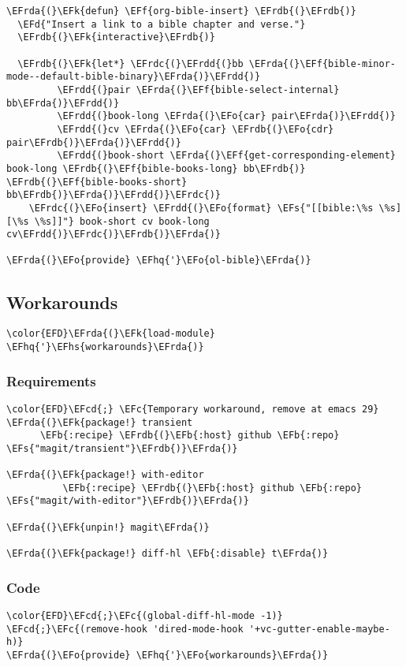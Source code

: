 \documentclass[a4wide,10pt]{article}
\newcommand{\EFc}[1]{\textcolor{EFc}{#1}} %
\newcommand{\EFcd}[1]{\textcolor{EFcd}{#1}} %
\newcommand{\EFs}[1]{\textcolor{EFs}{#1}} %
\newcommand{\EFd}[1]{\textcolor{EFd}{#1}} %
\newcommand{\EFk}[1]{\textcolor{EFk}{#1}} %
\newcommand{\EFb}[1]{\textcolor{EFb}{#1}} %
\newcommand{\EFf}[1]{\textcolor{EFf}{#1}} %
\newcommand{\EFo}[1]{\textcolor{EFo}{#1}} %
\newcommand{\EFhq}[1]{\textcolor{EFhq}{#1}} %
\newcommand{\EFhs}[1]{\textcolor{EFhs}{#1}} %
\newcommand{\EFrda}[1]{\textcolor{EFrda}{#1}} %
\newcommand{\EFrdb}[1]{\textcolor{EFrdb}{#1}} %
\newcommand{\EFrdc}[1]{\textcolor{EFrdc}{#1}} %
\newcommand{\EFrdd}[1]{\textcolor{EFrdd}{#1}} %
\begin{document}
\begin{Code}
\begin{Verbatim}
\EFrda{(}\EFk{defun} \EFf{org-bible-insert} \EFrdb{(}\EFrdb{)}
  \EFd{"Insert a link to a bible chapter and verse."}
  \EFrdb{(}\EFk{interactive}\EFrdb{)}

  \EFrdb{(}\EFk{let*} \EFrdc{(}\EFrdd{(}bb \EFrda{(}\EFf{bible-minor-mode--default-bible-binary}\EFrda{)}\EFrdd{)}
         \EFrdd{(}pair \EFrda{(}\EFf{bible-select-internal} bb\EFrda{)}\EFrdd{)}
         \EFrdd{(}book-long \EFrda{(}\EFo{car} pair\EFrda{)}\EFrdd{)}
         \EFrdd{(}cv \EFrda{(}\EFo{car} \EFrdb{(}\EFo{cdr} pair\EFrdb{)}\EFrda{)}\EFrdd{)}
         \EFrdd{(}book-short \EFrda{(}\EFf{get-corresponding-element} book-long \EFrdb{(}\EFf{bible-books-long} bb\EFrdb{)} \EFrdb{(}\EFf{bible-books-short} bb\EFrdb{)}\EFrda{)}\EFrdd{)}\EFrdc{)}
    \EFrdc{(}\EFo{insert} \EFrdd{(}\EFo{format} \EFs{"[[bible:\%s \%s][\%s \%s]]"} book-short cv book-long cv\EFrdd{)}\EFrdc{)}\EFrdb{)}\EFrda{)}

\EFrda{(}\EFo{provide} \EFhq{'}\EFo{ol-bible}\EFrda{)}
\end{Verbatim}
\end{Code}
\subsection{Workarounds}
\label{sec:org420b92f}
\begin{Code}
\begin{Verbatim}
\color{EFD}\EFrda{(}\EFk{load-module} \EFhq{'}\EFhs{workarounds}\EFrda{)}
\end{Verbatim}
\end{Code}
\subsubsection{Requirements}
\label{sec:orgfca44cc}
\begin{Code}
\begin{Verbatim}
\color{EFD}\EFcd{;} \EFc{Temporary workaround, remove at emacs 29}
\EFrda{(}\EFk{package!} transient
      \EFb{:recipe} \EFrdb{(}\EFb{:host} github \EFb{:repo} \EFs{"magit/transient"}\EFrdb{)}\EFrda{)}

\EFrda{(}\EFk{package!} with-editor
          \EFb{:recipe} \EFrdb{(}\EFb{:host} github \EFb{:repo} \EFs{"magit/with-editor"}\EFrdb{)}\EFrda{)}

\EFrda{(}\EFk{unpin!} magit\EFrda{)}

\EFrda{(}\EFk{package!} diff-hl \EFb{:disable} t\EFrda{)}
\end{Verbatim}
\end{Code}
\subsubsection{Code}
\label{sec:org57be451}
\begin{Code}
\begin{Verbatim}
\color{EFD}\EFcd{;}\EFc{(global-diff-hl-mode -1)}
\EFcd{;}\EFc{(remove-hook 'dired-mode-hook '+vc-gutter-enable-maybe-h)}
\EFrda{(}\EFo{provide} \EFhq{'}\EFo{workarounds}\EFrda{)}
\end{Verbatim}
\end{Code}
\end{document}
